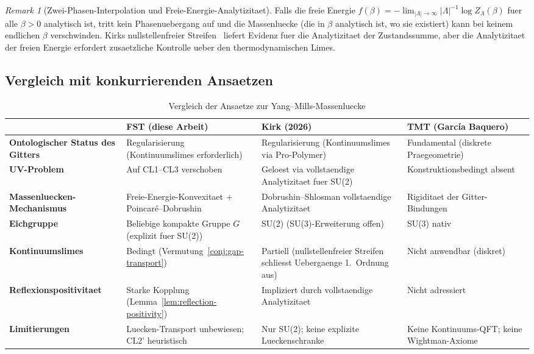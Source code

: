\documentclass[12pt,a4paper]{article}
\theoremstyle{definition}
\theoremstyle{plain}
\theoremstyle{remark}
\newtheorem{remark}[definition]{Remark}
\begin{document}
\begin{remark}[Zwei-Phasen-Interpolation und Freie-Energie-Analytizitaet]
\label{rem:two-phase}
Falls die freie Energie $f(\beta) = -\lim_{|\Lambda| \to \infty} |\Lambda|^{-1} \log Z_\Lambda(\beta)$ fuer alle $\beta > 0$ analytisch ist, tritt kein Phasenuebergang auf und die Massenluecke (die in $\beta$ analytisch ist, wo sie existiert) kann bei keinem endlichen $\beta$ verschwinden. Kirks nullstellenfreier Streifen~\cite{Kirk2026b} liefert Evidenz fuer die Analytizitaet der Zustandssumme, aber die Analytizitaet der freien Energie erfordert zusaetzliche Kontrolle ueber den thermodynamischen Limes.
\end{remark}

\subsection{Vergleich mit konkurrierenden Ansaetzen}

\begin{table}[h]
\centering
\caption{Vergleich der Ansaetze zur Yang--Mills-Massenluecke}
\label{tab:comparison}
\begin{tabular}{l|p{3.5cm}|p{3.5cm}|p{3.5cm}}
\hline
& \textbf{FST (diese Arbeit)} & \textbf{Kirk (2026)} & \textbf{TMT (Garc\'ia Baquero)} \\
\hline
\textbf{Ontologischer Status des Gitters} & Regularisierung (Kontinuumslimes erforderlich) & Regularisierung (Kontinuumslimes via Pro-Polymer) & Fundamental (diskrete Praegeometrie) \\
\hline
\textbf{UV-Problem} & Auf CL1--CL3 verschoben & Geloest via vollstaendige Analytizitaet fuer SU(2) & Konstruktionsbedingt absent \\
\hline
\textbf{Massenluecken-Mechanismus} & Freie-Energie-Konvexitaet $+$ Poincar\'e--Dobrushin & Dobrushin--Shlosman vollstaendige Analytizitaet & Rigiditaet der Gitter-Bindungen \\
\hline
\textbf{Eichgruppe} & Beliebige kompakte Gruppe $G$ (explizit fuer SU(2)) & SU(2) (SU(3)-Erweiterung offen) & SU(3) nativ \\
\hline
\textbf{Kontinuumslimes} & Bedingt (Vermutung~\ref{conj:gap-transport}) & Partiell (nullstellenfreier Streifen schliesst Uebergaenge 1.~Ordnung aus) & Nicht anwendbar (diskret) \\
\hline
\textbf{Reflexionspositivitaet} & Starke Kopplung (Lemma~\ref{lem:reflection-positivity}) & Impliziert durch vollstaendige Analytizitaet & Nicht adressiert \\
\hline
\textbf{Limitierungen} & Luecken-Transport unbewiesen; CL2' heuristisch & Nur SU(2); keine explizite Lueckenschranke & Keine Kontinuums-QFT; keine Wightman-Axiome \\
\hline
\end{tabular}
\end{table}
\end{document}
